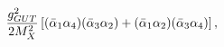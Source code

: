 \begin{equation}\label{fiveamp}
{g_{GUT}^2\over 2M_X^2}\left[
(\bar\alpha_1\alpha_4)(\bar\alpha_3\alpha_2)+(\bar\alpha_1\alpha_2)
(\bar\alpha_3\alpha_4) \right],\end{equation} 
